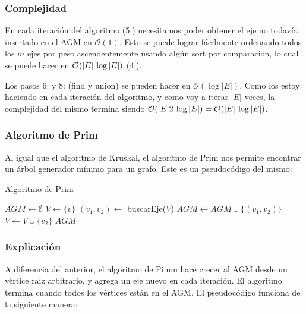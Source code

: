 \subsubsection*{Complejidad}

En cada iteraci\'on del algoritmo (5:) necesitamos poder obtener el eje no todav\'ia insertado en el AGM en $\mathcal{O}(1)$. Esto se puede lograr f\'acilmente ordenando todos los $m$ ejes por peso ascendentemente usando alg\'un sort por comparaci\'on, lo cual se puede hacer en $\mathcal{O}(|E| \hspace{2px}\log{}|E|)$ (4:).

Los pasos 6: y 8: (find y union) se pueden hacer en $\mathcal{O}(\log{} |E|)$. Como los estoy haciendo en cada iteraci\'on del algoritmo, y como voy a iterar $|E|$ veces, la complejidad del mismo termina siendo $\mathcal{O}(|E| 2 \hspace{2px}\log{}|E|) = \mathcal{O}(|E| \hspace{2px}\log{}|E|)$.

\newpage
\subsubsection{Algoritmo de Prim}

Al igual que el algoritmo de Kruskal, el algoritmo de Prim nos permite encontrar un \'arbol generador m\'inimo para un grafo. Este es un pseudoc\'odigo del mismo:

\begin{algorithm}
\caption{Algoritmo de Prim}
\begin{algorithmic}[1]
\State $AGM \gets \emptyset$
\State $V \gets \{ v \}$
  \State $(v_1, v_2) \gets$ buscarEje($V$)
  \State $AGM \gets AGM \cup \{ (v_1, v_2) \}$
  \State $V \gets V \cup \{ v_2 \}$
\EndWhile
\Return $AGM$
\end{algorithmic}
\end{algorithm}

\subsubsection*{Explicaci\'on}

A diferencia del anterior, el algoritmo de Pimm hace crecer al AGM desde un v\'ertice raiz arbitrario, y agrega un eje nuevo en cada iteraci\'on. El algoritmo termina cuando todos los v\'ertices est\'an en el AGM. El pseudoc\'odigo funciona de la siguiente manera:

